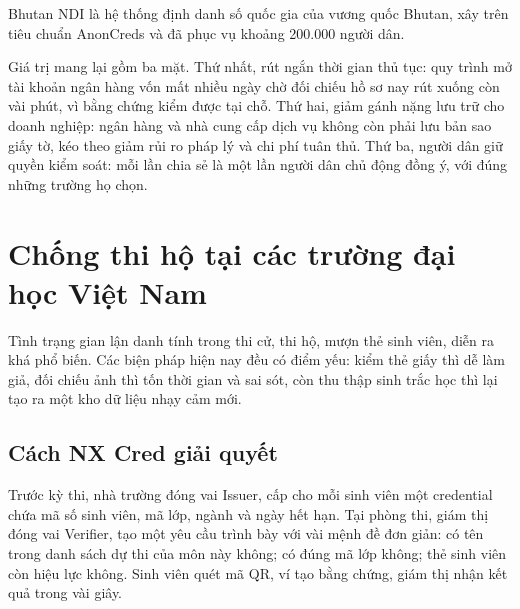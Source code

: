 \documentclass[a4paper,11pt,oneside]{report}
\theoremstyle{definition}
\theoremstyle{plain}
\begin{document}
Bhutan NDI là hệ thống định danh số quốc gia của vương quốc Bhutan, xây trên tiêu chuẩn
AnonCreds và đã phục vụ khoảng 200.000 người dân.

Giá trị mang lại gồm ba mặt. Thứ nhất, rút ngắn thời gian thủ tục: quy trình mở tài khoản ngân
hàng vốn mất nhiều ngày chờ đối chiếu hồ sơ nay rút xuống còn vài phút, vì bằng chứng kiểm được
tại chỗ. Thứ hai, giảm gánh nặng lưu trữ cho doanh nghiệp: ngân hàng và nhà cung cấp dịch vụ
không còn phải lưu bản sao giấy tờ, kéo theo giảm rủi ro pháp lý và chi phí tuân thủ. Thứ ba,
người dân giữ quyền kiểm soát: mỗi lần chia sẻ là một lần người dân chủ động đồng ý, với đúng
những trường họ chọn.

\section{Chống thi hộ tại các trường đại học Việt Nam}

Tình trạng gian lận danh tính trong thi cử, thi hộ, mượn thẻ sinh viên, diễn ra khá phổ
biến. Các biện pháp hiện nay đều có điểm yếu: kiểm thẻ giấy thì dễ làm giả, đối chiếu ảnh thì tốn
thời gian và sai sót, còn thu thập sinh trắc học thì lại tạo ra một kho dữ liệu nhạy cảm mới.

\subsection{Cách NX Cred giải quyết}

Trước kỳ thi, nhà trường đóng vai Issuer, cấp cho mỗi sinh viên một
credential chứa mã số sinh viên, mã lớp, ngành và ngày hết hạn. Tại phòng thi,
giám thị đóng vai Verifier, tạo một yêu cầu trình bày với vài mệnh đề
đơn giản: có tên trong danh sách dự thi của môn này không; có đúng mã lớp không; thẻ sinh viên
còn hiệu lực không. Sinh viên quét mã QR, ví tạo bằng chứng, giám thị nhận kết quả trong vài
giây.

\begin{center}
\end{center}
\end{document}
